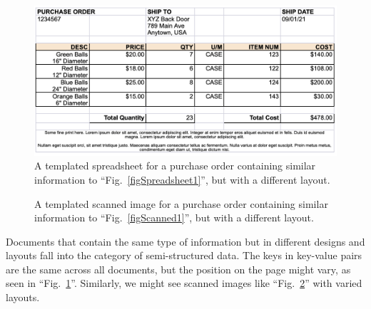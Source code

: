 \documentclass[conference, draftcls]{IEEEtran}
\begin{document}
\begin{figure}[ht]
\centerline{\includegraphics[width=\columnwidth]{Spreadsheet2.png}}
\caption{A templated spreadsheet for a purchase order containing similar information to ``Fig.~\ref{figSpreadsheet1}'', but with a different layout.}
\label{figSpreadsheet2}
\end{figure}

\begin{figure}[ht]
    \centerline{
}
\caption{A templated scanned image for a purchase order containing similar information to ``Fig.~\ref{figScanned1}'', but with a different layout.}
\label{figScanned2}
\end{figure}

Documents that contain the same type of information but in different designs and layouts fall into the category of semi-structured data. The keys in key-value pairs are the same across all documents, but the position on the page might vary, as seen in ``Fig.~\ref{figSpreadsheet2}''. Similarly, we might see scanned images like ``Fig.~\ref{figScanned2}'' with varied layouts.
\end{document}
